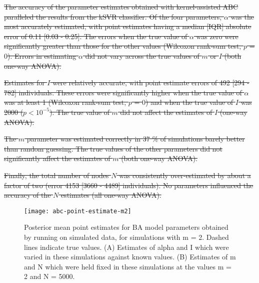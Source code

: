 {\color{red}\sout{
The accuracy of the parameter estimates obtained with kernel-assisted ABC
paralleled the results from the \gls{kSVR} classifier. Of the four parameters,
$\alpha$ was the most accurately estimated, with point estimates having a
median [IQR] absolute error of 
    0.11 
    [0.03 - 
    0.25].
The errors when the true value of $\alpha$ was zero were significantly greater
than those for the other values 
    (Wilcoxon rank-sum test, $p$ = $0$).
Errors in estimating $\alpha$ 
did not vary across the true values of $m$ or $I$ (both
one-way ANOVA).}

\sout{Estimates for $I$ were relatively accurate, with point estimate errors of
    492 
    [294 - 
    782] individuals.
These errors were significantly higher when the true value of $\alpha$ was
at least 1
    (Wilcoxon rank-sum test, $p$ = $0$)
and when the true value of $I$ was 2000 ($p < 10^{-5}$). The true value of $m$
did not affect the estimates of $I$ (one-way ANOVA).}

\sout{The $m$ parameter was estimated correctly in
    37 \%
of simulations barely better than random guessing. The true values of the other
parameters did not significantly affect the
estimates of $m$ (both one-way ANOVA).}

\sout{Finally, the total number of nodes $N$ was consistently over-estimated by about
a factor of two (error 4153
[3660 - 4489] individuals). No parameters influenced the accuracy of the $N$
estimates (all one-way ANOVA).}}

\begin{figure}[ht]
  \centering
  \texttt{[image: abc-point-estimate-m2]}
  \vspace{6pt}
  \caption[
    Posterior mean point estimates for \gls{BA} model parameters obtained by
    running  on simulated data, for simulations with \gls{m} =
    2.
  ]{
    Posterior mean point estimates for \gls{BA} model parameters obtained by
    running  on simulated data, for simulations with \gls{m} =
    2. Dashed lines indicate true values. (A) Estimates of \gls{alpha} and
    \gls{I} which were varied in these simulations against known values. (B)
    Estimates of \gls{m} and \gls{N} which were held fixed in these simulations
    at the values \gls{m} = 2 and \gls{N} = 5000.
  }
  \label{fig:abcptm2}
\end{figure}

